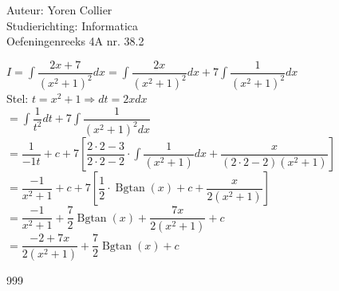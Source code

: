 \documentclass[a4paper]{article}
\newcommand{\adR}{\Rightarrow} %
\newcommand{\Lh}{\left(} %
\newcommand{\Rh}{\right)}
\newcommand{\Lv}{\left[} %
\newcommand{\Rv}{\right]}
\newcommand{\intgrl}{\displaystyle\int} %
\begin{document}
\noindent \large Auteur: Yoren Collier \\
\noindent \large Studierichting: Informatica\\
\noindent \large Oefeningenreeks 4A nr. 38.2\\

\medskip

\normalsize

$ I =  \intgrl \dfrac{2x+7}{\Lh x^2 +1 \Rh^2} dx = \intgrl \dfrac{2x}{\Lh x^2 +1 \Rh^2} dx + 7\intgrl \dfrac{1}{\Lh x^2 +1 \Rh^2} dx$\\

Stel: $t = x^2 +1 \adR dt = 2x dx$\\

$= \intgrl \dfrac{1}{t^2}dt +7 \intgrl \dfrac{1}{\Lh x^2 +1 \Rh^2 dx}$\\

$= \dfrac{1}{-1t} +c +7 \Lv \dfrac{2 \cdot 2 -3}{2 \cdot 2 -2} \cdot \intgrl \dfrac{1}{\Lh x^2 +1 \Rh} dx + \dfrac{x}{\Lh 2 \cdot 2 -2 \Rh \Lh x^2 +1 \Rh}\Rv$\\

$= \dfrac{-1}{x^2 +1} +c +7 \Lv \dfrac{1}{2} \cdot \operatorname{Bgtan} \Lh x \Rh +c + \dfrac{x}{2 \Lh x^2 +1 \Rh} \Rv $\\

$= \dfrac{-1}{x^2 +1} + \dfrac{7}{2} \operatorname{Bgtan} \Lh x \Rh + \dfrac{7x}{2 \Lh x^2 +1 \Rh} +c$\\

$= \dfrac{-2 +7x}{2 \Lh x^2 +1 \Rh} + \dfrac{7}{2} \operatorname{Bgtan} \Lh x \Rh +c$\\

\begin{thebibliography}{999}
\end{thebibliography}
\end{document}
